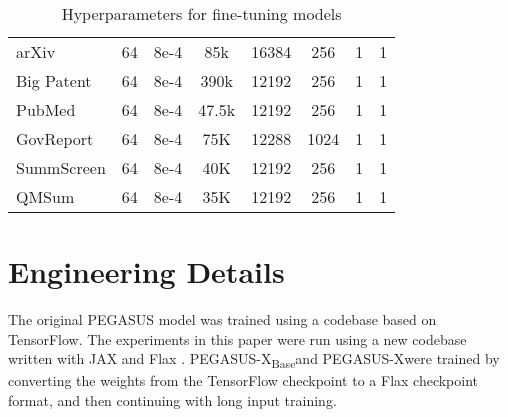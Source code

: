 \documentclass[11pt]{article}
\newcommand{\largemodel}{PEGASUS-X}
\newcommand{\smallmodel}{{PEGASUS-X\textsubscript{Base}}}
\begin{document}
\begin{table*}[th]
\begin{tabular}{l ccccccc}
    arXiv
    & 64 & 8e-4 & 85k & 16384 & 256 & 1 &  1
    \\
    Big Patent
    & 64 & 8e-4 & 390k & 12192 & 256 & 1 &  1
    \\
    PubMed
    & 64 & 8e-4 & 47.5k & 12192 & 256 & 1 &  1
    \\
    GovReport
    & 64 & 8e-4 & 75K & 12288 & 1024 & 1 &  1
    \\
    SummScreen
    & 64 & 8e-4 & 40K & 12192 & 256 & 1 &  1
    \\
    QMSum
    & 64 & 8e-4 & 35K & 12192 & 256 & 1 &  1
    \\
\bottomrule
\end{tabular}\caption{
  Hyperparameters for fine-tuning models
}
\label{tab:table_a2_finetuning_hyperparameters}
\end{table*} 
\section{Engineering Details}

The original PEGASUS model was trained using a codebase based on TensorFlow.
The experiments in this paper were run using a new codebase written with JAX \citep{jax2018github} and Flax \citep{flax2020github}.
\smallmodel and \largemodel were trained by converting the weights from the TensorFlow checkpoint to a Flax checkpoint format, and then continuing with long input training.
\end{document}
